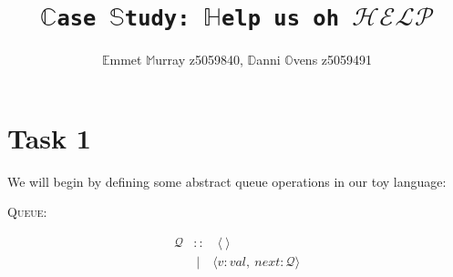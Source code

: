 \documentclass[a4paper]{scrartcl}
\title{\texttt{$\mathbb{C}$ase $\mathbb{S}$tudy: $\mathbb{H}$elp us oh $\mathcal{HELP}$}}
\author{$\mathbb{E}$mmet $\mathbb{M}$urray z5059840, $\mathbb{D}$anni $\mathbb{O}$vens z5059491}
\begin{document}
\maketitle
\section*{Task 1}
We will begin by defining some abstract queue operations in our toy language:\\
%
\begin{center}
{\LARGE{\textsc{Queue:}}\normalsize}
\end{center}
\begin{align*}
\mathcal{Q} &:: \quad \langle ~ \rangle \\
&~| \quad \langle v : val,~\mathit{next} : \mathcal{Q} \rangle \\
\end{align*}
%
\end{document}
